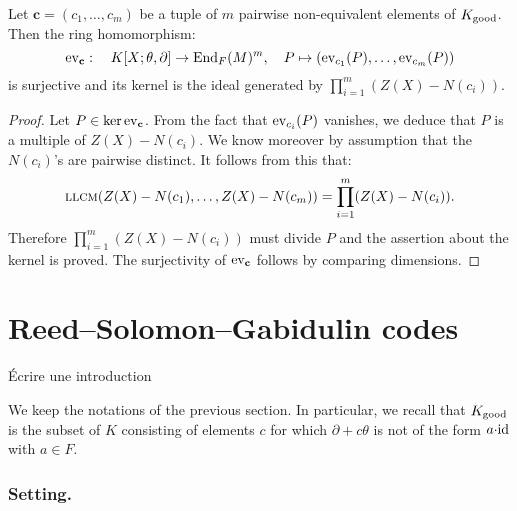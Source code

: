 \documentclass[a4paper]{llncs}
\def\todo#1{{\color{todo} #1}}
\newcommand{\id}{\textrm{\rm id}}
\newcommand{\End}{\textrm{\rm End}}
\newcommand{\ev}[1]{\textrm{\rm ev}_{#1}}
\newcommand{\llcm}{\textsc{llcm}}
\newcommand{\bc}{\textbf{c}}
\newcommand{\good}{\textrm{\rm good}}
\begin{document}
\begin{proposition}
\label{prop:evbc}
Let $\bc = (c_1, \ldots, c_m)$ be a tuple of $m$ pairwise non-equivalent 
elements of $K_\good$.
Then the ring homomorphism:
$$\ev \bc : \quad K[X;\theta,\partial] \to \End_F(M)^m, \quad
P \mapsto (\ev{c_1}(P), \ldots, \ev{c_m}(P))$$
is surjective and its kernel is the ideal generated by
$\prod_{i=1}^m (Z(X) - N(c_i))$.
\end{proposition}

\begin{proof}
Let $P \in \ker \ev\bc$. From the fact that $\ev{c_i}(P)$ vanishes,
we deduce that $P$ is a multiple of $Z(X) - N(c_i)$. We know moreover
by assumption that the $N(c_i)$'s are pairwise distinct. It follows
from this that:
$$\llcm(Z(X)-N(c_1), \ldots, Z(X)-N(c_m)) = 
\prod_{i=1}^m (Z(X) - N(c_i)).$$
Therefore $\prod_{i=1}^m (Z(X) - N(c_i))$ must divide $P$ and the
assertion about the kernel is proved. The surjectivity of $\ev\bc$
follows by comparing dimensions.
\end{proof}

\section{Reed--Solomon--Gabidulin codes}

\todo{Écrire une introduction}

We keep the notations of the previous section. In particular, we recall 
that $K_\good$ is the subset of $K$ consisting of elements $c$ for which 
$\partial + c\theta$ is not of the form $a{\cdot}\id$ with $a \in F$.

\subsubsection*{Setting.}
\end{document}
